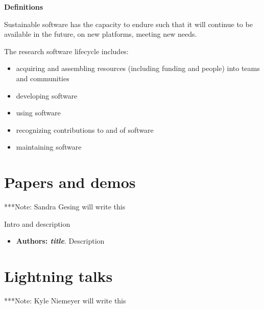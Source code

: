 \documentclass[11pt, oneside]{amsart}
\newcommand{\note}[1]{ {\textcolor{blueish}    { ***Note:      #1 }}}
\begin{document}
{\bf Definitions}

Sustainable software has the capacity to endure such that it will continue to be available in the future, on new platforms, meeting new needs.

The research software lifecycle includes:
\begin{itemize}
\item acquiring and assembling resources (including funding and people) into teams and communities
\item developing software
\item using software
\item recognizing contributions to and of software
\item maintaining software
\end{itemize}


\section{Papers and demos} \label{sec:papers}

\note{Sandra Gesing will write this}

Intro and description
%
\begin{itemize}
\item \textbf{Authors: \emph{title}}.
Description

\end{itemize}


\section{Lightning talks} \label{sec:lightning}
\begin{comment}
\note{
\href{http://wssspe.researchcomputing.org.uk/wssspe4/agenda/}{Slides.}}
\end{comment}

\note{Kyle Niemeyer will write this}
\end{document}
